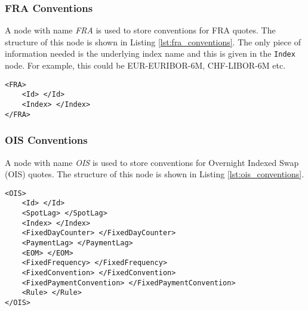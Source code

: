 \subsubsection{FRA Conventions}
A node with name \emph{FRA} is used to store conventions for FRA quotes. The structure of this node is shown in Listing 
\ref{lst:fra_conventions}. The only piece of information needed is the underlying index name and this is given in the 
\lstinline!Index! node. For example, this could be EUR-EURIBOR-6M, CHF-LIBOR-6M etc.

\begin{lstlisting}[caption={FRA conventions}, label=lst:fra_conventions]
<FRA>
	<Id> </Id>
	<Index> </Index>
</FRA>
\end{lstlisting}

\subsubsection{OIS Conventions}

A node with name \emph{OIS} is used to store conventions for Overnight Indexed Swap (OIS) quotes. The structure of this 
node is shown in Listing \ref{lst:ois_conventions}.

\begin{lstlisting}[caption={OIS conventions}, label=lst:ois_conventions]
<OIS>
	<Id> </Id>
	<SpotLag> </SpotLag>
	<Index> </Index>
	<FixedDayCounter> </FixedDayCounter>
	<PaymentLag> </PaymentLag>
	<EOM> </EOM>
	<FixedFrequency> </FixedFrequency>
	<FixedConvention> </FixedConvention>
	<FixedPaymentConvention> </FixedPaymentConvention>
	<Rule> </Rule>
</OIS>
\end{lstlisting}

